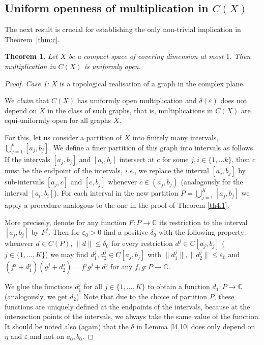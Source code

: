 \documentclass[12pt,fleqn]{amsart}
\newtheorem{theorem}{Theorem}[section]
\theoremstyle{definition}
\numberwithin{equation}{section}
\theoremstyle{remark}
\begin{document}
\subsection{Uniform openness of multiplication in \texorpdfstring{$C(X)$}{TEXT}}
The next result is crucial for establishing the only non-trivial implication in Theorem~\ref{thm:c}.
%
\begin{theorem}
    Let $X$ be a compact space of covering dimension at most $1$. Then multiplication in $C(X)$ is uniformly open.
\end{theorem}
%
\begin{proof}
    \emph{Case 1:} $X$ is a topological realisation of a graph in the complex plane. \smallskip
    
    We \emph{claim} that $C(X)$ has uniformly open multiplication and $\delta(\varepsilon)$ does not depend on $X$ in the class of such graphs, that is, multiplications in $C(X)$ are equi-uniformly open for all graphs $X$.\smallskip
    
    For this, let us consider a partition of $X$ into finitely many intervals, $\bigcup_{j=1}^{k} [a_j, b_j]$. We define a finer partition of this graph into intervals as follows. If the intervals $[a_j, b_j]$ and $[a_i, b_i]$ intersect at $c$ for some $j,i \in \{1,\ldots k\}$, then $c$ must be the endpoint of the intervals, \emph{i.e}., we replace the interval $[a_j, b_j]$ by sub-intervals $[a_j, c]$ and $[c, b_j]$ whenever $c\in (a_j,b_j)$ (analogously for the interval $[a_i, b_i]$). For each interval in the new partition $P=\bigcup_{j=1}^{K} [a_j, b_j]$ we apply a procedure analogous to the one in the proof of Theorem \ref{th4.1}. \smallskip
    
    More precisely, denote for any function $F\colon P\rightarrow \mathbb{C}$ its restriction to the interval $[a_j,b_j]$ by $F^j.$ Then for $\varepsilon_{0}>0$ find a positive $\delta_{0}$ with the following property: whenever $d\in C(P)$, $\|d\| \leqslant \delta_{0}$ for every restriction $d^j\in C[a_j, b_j]$ ($j \in \{1,\ldots,K\}$) we may find $d_{1}^j, d_{2}^j \in C[a_j, b_j]$ with $\|d_{1}^j\|,\|d_{2}^j\| \leqslant \varepsilon_{0}$ and $(f^j+d_{1}^j)(g^j+d_{2}^j)=f^j g^j+d^j$ for any $f,g\colon P \rightarrow \mathbb{C}.$ 
    
    We glue the functions $d_1^j$ for all $j \in \{1,\ldots,K\}$ to obtain a function $d_1\colon P\rightarrow \mathbb{C}$ (analogously, we get $d_2$). Note that due to the choice of partition $P$, these functions are uniquely defined at the endpoints of the intervals, because at the intersection points of the intervals, we always take the same value of the function. It should be noted also (again) that the $\delta$ in Lemma \ref{l4.10} does only depend on $\eta$ and $\varepsilon$ and not on $a_{0}, b_{0}$.\medskip


\end{proof}
\end{document}
